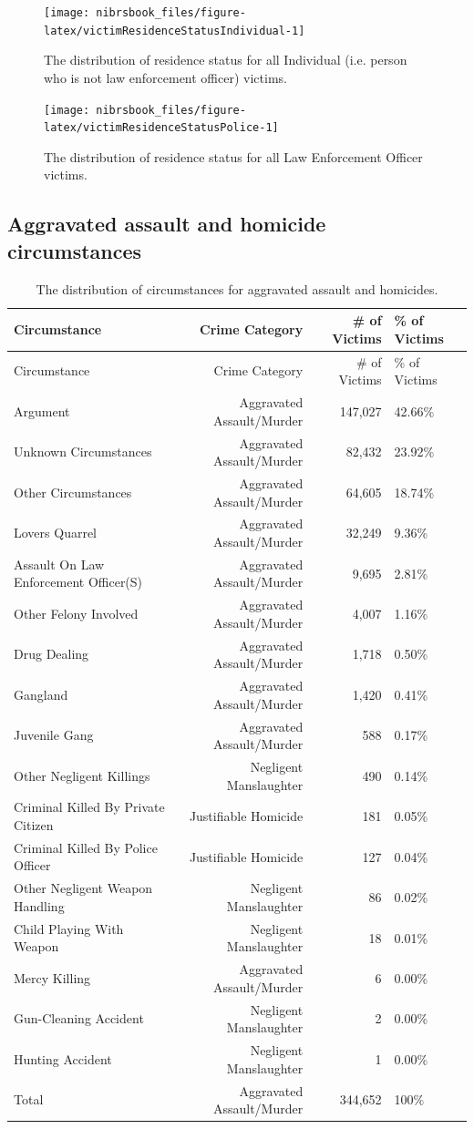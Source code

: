 \documentclass[
  12pt,
  openany]{book}
\begin{document}
\begin{figure}

{\centering \texttt{[image: nibrsbook\_files/figure-latex/victimResidenceStatusIndividual-1]} 

}

\caption{The distribution of residence status for all Individual (i.e. person who is not law enforcement officer) victims.}\label{fig:victimResidenceStatusIndividual}
\end{figure}

\begin{figure}

{\centering \texttt{[image: nibrsbook\_files/figure-latex/victimResidenceStatusPolice-1]} 

}

\caption{The distribution of residence status for all Law Enforcement Officer victims.}\label{fig:victimResidenceStatusPolice}
\end{figure}

\hypertarget{aggravated-assault-and-homicide-circumstances}{%
\subsection{Aggravated assault and homicide circumstances}\label{aggravated-assault-and-homicide-circumstances}}

\begin{longtable}[]{@{}lrrl@{}}
\caption{\label{tab:victimAggAssault}The distribution of circumstances for aggravated assault and homicides.}\tabularnewline
\toprule
Circumstance & Crime Category & \# of Victims & \% of Victims\tabularnewline
\midrule
\endfirsthead
\toprule
Circumstance & Crime Category & \# of Victims & \% of Victims\tabularnewline
\midrule
\endhead
Argument & Aggravated Assault/Murder & 147,027 & 42.66\%\tabularnewline
Unknown Circumstances & Aggravated Assault/Murder & 82,432 & 23.92\%\tabularnewline
Other Circumstances & Aggravated Assault/Murder & 64,605 & 18.74\%\tabularnewline
Lovers Quarrel & Aggravated Assault/Murder & 32,249 & 9.36\%\tabularnewline
Assault On Law Enforcement Officer(S) & Aggravated Assault/Murder & 9,695 & 2.81\%\tabularnewline
Other Felony Involved & Aggravated Assault/Murder & 4,007 & 1.16\%\tabularnewline
Drug Dealing & Aggravated Assault/Murder & 1,718 & 0.50\%\tabularnewline
Gangland & Aggravated Assault/Murder & 1,420 & 0.41\%\tabularnewline
Juvenile Gang & Aggravated Assault/Murder & 588 & 0.17\%\tabularnewline
Other Negligent Killings & Negligent Manslaughter & 490 & 0.14\%\tabularnewline
Criminal Killed By Private Citizen & Justifiable Homicide & 181 & 0.05\%\tabularnewline
Criminal Killed By Police Officer & Justifiable Homicide & 127 & 0.04\%\tabularnewline
Other Negligent Weapon Handling & Negligent Manslaughter & 86 & 0.02\%\tabularnewline
Child Playing With Weapon & Negligent Manslaughter & 18 & 0.01\%\tabularnewline
Mercy Killing & Aggravated Assault/Murder & 6 & 0.00\%\tabularnewline
Gun-Cleaning Accident & Negligent Manslaughter & 2 & 0.00\%\tabularnewline
Hunting Accident & Negligent Manslaughter & 1 & 0.00\%\tabularnewline
Total & Aggravated Assault/Murder & 344,652 & 100\%\tabularnewline
\bottomrule
\end{longtable}
\end{document}
